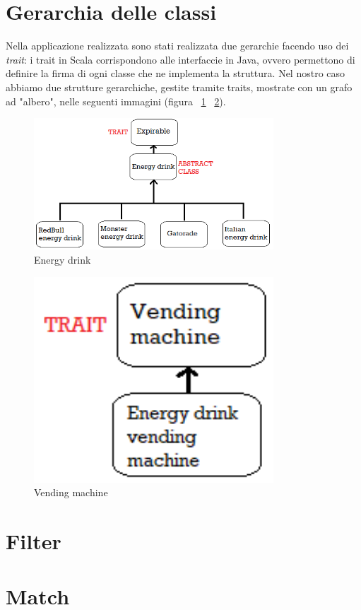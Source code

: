 \section{Gerarchia delle classi}
Nella applicazione realizzata sono stati realizzata due gerarchie facendo uso dei \textit{trait}: i trait in Scala corrispondono alle interfaccie in Java, ovvero permettono di definire la firma di ogni classe che ne implementa la struttura.
Nel nostro caso abbiamo due strutture gerarchiche, gestite tramite traits, mostrate con un grafo ad "albero", nelle seguenti immagini (figura ~\ref{fig:energyDrink} ~\ref{fig:vendingMachine}).
	\begin{figure}[h]
	\centering
	\includegraphics[width=0.8\textwidth]{Immagini/EnergyDrink.png}
	\caption{Energy drink}
	\label{fig:energyDrink}
\end{figure}
	\begin{figure}[h]
	\centering
	\includegraphics[width=0.8\textwidth]{Immagini/VendingMachine.png}
	\caption{Vending machine}
	\label{fig:vendingMachine}
\end{figure}

\section{Filter}
\section{Match}
